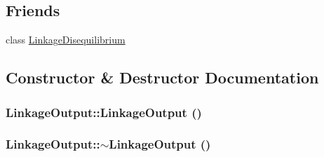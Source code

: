 \subsection*{Friends}
\begin{DoxyCompactItemize}
\item 
class \hyperlink{classLinkageOutput_a07cd45779d19a552153e61c58105cbf2}{LinkageDisequilibrium}
\end{DoxyCompactItemize}


\subsection{Constructor \& Destructor Documentation}
\hypertarget{classLinkageOutput_abc8ce9e012b6b659931451b78d43ff1d}{
\subsubsection[{LinkageOutput}]{\setlength{\rightskip}{0pt plus 5cm}LinkageOutput::LinkageOutput ()}}
\label{classLinkageOutput_abc8ce9e012b6b659931451b78d43ff1d}
\hypertarget{classLinkageOutput_a931ff7e88c2f277cb22825426667ee1d}{
\subsubsection[{$\sim$LinkageOutput}]{\setlength{\rightskip}{0pt plus 5cm}LinkageOutput::$\sim$LinkageOutput ()}}
\label{classLinkageOutput_a931ff7e88c2f277cb22825426667ee1d}


